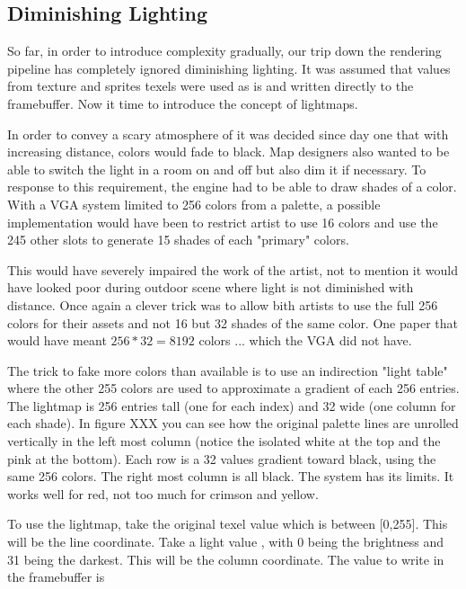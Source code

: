 \subsection{Diminishing Lighting}
\label{diminishedlightning}
\begin{figure}
\centering
{}
\end{figure}
So far, in order to introduce complexity gradually, our trip down the rendering pipeline has completely ignored diminishing lighting. It was assumed that values from texture and sprites texels were used as is and written directly to the framebuffer. Now it time to introduce the concept of lightmaps.\\
\par
In order to convey a scary atmosphere of it was decided since day one that with increasing distance, colors would fade to black. Map designers also wanted to be able to switch the light in a room on and off but also dim it if necessary. To response to this requirement, the engine had to be able to draw shades of a color. With a VGA system limited to 256 colors from a palette, a possible implementation would have been to restrict artist to use 16 colors and use the 245 other slots to generate 15 shades of each "primary" colors.\\
\par
This would have severely impaired the work of the artist, not to mention it would have looked poor during outdoor scene where light is not diminished with distance. Once again a clever trick was to allow bith artists to use the full 256 colors for their assets and not 16 but 32 shades of the same color. One paper that would have meant $256 * 32 = 8192$ colors ... which the VGA did not have.\\
\par
 The trick to fake more colors than available is to use an indirection "light table" where the other 255 colors are used to approximate a gradient of each 256 entries. The lightmap is 256 entries tall (one for each index) and 32 wide (one column for each shade). In figure XXX you can see how the original palette lines are unrolled vertically in the left most column (notice the isolated white at the top and the pink at the bottom). Each row is a 32 values gradient toward black, using the same 256 colors. The right most column is all black. The system has its limits. It works well for red, not too much for crimson and yellow.\\
 \par
 To use the lightmap, take the original texel value  which is between [0,255]. This will be the line coordinate. Take a light value , with 0 being the brightness and 31 being the darkest. This will be the column coordinate. The value to write in the framebuffer is \\
 \par
{}





